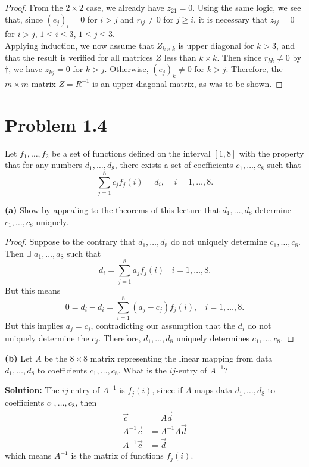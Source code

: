 \documentclass{article}
\newcommand{\enterProblemHeader}[1]{
    \nobreak\extramarks{}{Problem \arabic{#1} continued on next page\ldots}\nobreak{}
    \nobreak\extramarks{Problem \arabic{#1} (continued)}{Problem \arabic{#1} continued on next page\ldots}\nobreak{}
}
\newcommand{\exitProblemHeader}[1]{
    \nobreak\extramarks{Problem \arabic{#1} (continued)}{Problem \arabic{#1} continued on next page\ldots}\nobreak{}
    \stepcounter{#1}
    \nobreak\extramarks{Problem \arabic{#1}}{}\nobreak{}
}
\newcounter{partCounter}
\newcounter{homeworkProblemCounter}
\newenvironment{homeworkProblem}[1][-1]{
    \ifnum#1>0
        \setcounter{homeworkProblemCounter}{#1}
    \fi
    \section{Problem \arabic{homeworkProblemCounter}}
    \setcounter{partCounter}{1}
    \enterProblemHeader{homeworkProblemCounter}
}{
    \exitProblemHeader{homeworkProblemCounter}
}
\begin{document}
\begin{proof}
From the $2 \times 2$ case, we already have $z_{21} = 0$. Using the same logic, we see that, since $(e_j)_i = 0$ for $i > j$ and $r_{ij} \neq 0$ for $j \geq i$, it is necessary that $z_{ij} = 0$ for $i > j$, $1 \leq i \leq 3$, $1 \leq j \leq 3$.\\

Applying induction, we now assume that $Z_{k \times k}$ is upper diagonal for $k > 3$, and that the result is verified for all matrices $Z$ less than $k \times k$. Then since $r_{kk} \neq 0$ by $\dagger$, we have $z_{kj} = 0$ for $k > j$. Otherwise, $(e_j)_k \neq 0$ for $k > j$. Therefore, the $m \times m$ matrix $Z = R^{-1}$ is an upper-diagonal matrix, as was to be shown.

\end{proof} 


\pagebreak
\section*{Problem 1.4}
Let $f_1, \dots , f_2$ be a set of functions defined on the interval $[1, 8]$ with the property that for any numbers $d_1, \dots , d_8$, there exists a set of coefficients $c_1, \dots , c_8$ such that 
\[\sum_{j=1}^8 c_j f_j(i) = d_i, ~~~~~ i = 1, \dots , 8. \]

\textbf{(a)} Show by appealing to the theorems of this lecture that $d_1, \dots , d_8$ determine $c_1, \dots , c_8$ uniquely.

\begin{proof}
    Suppose to the contrary that $d_1, \dots , d_8$ do not uniquely determine $c_1, \dots , c_8$. Then $\exists$ $a_1, \dots , a_8$ such that \[d_i = \sum_{j=1}^8 a_j f_j(i) ~~~~ i = 1, \dots , 8.\] But this means \[0 = d_i - d_i = \sum_{i = 1}^8 (a_j - c_j)f_j(i), ~~~~ i = 1, \dots, 8.\] But this implies $a_j = c_j$, contradicting our assumption that the $d_i$ do not uniquely determine the $c_j$. Therefore, $d_1, \dots , d_8$ uniquely determines $c_1, \dots, c_8$.
\end{proof}

\textbf{(b)} Let $A$ be the $8 \times 8$ matrix representing the linear mapping from data $d_1, \dots , d_8$ to coefficients $c_1, \dots, c_8$. What is the $ij$-entry of $A^{-1}$?

\textbf{Solution:} The $ij$-entry of $A^{-1}$ is $f_j(i)$, since if $A$ maps data $d_1, \dots , d_8$ to coefficients $c_1, \dots, c_8$, then
\begin{align}
    \vec{c} &= A\vec{d}\\
    A^{-1}\vec{c} &= A^{-1}A\vec{d}\\
    A^{-1}\vec{c} &= \vec{d}
\end{align}
which means $A^{-1}$ is the matrix of functions $f_j(i)$.

\pagebreak

%
%

\end{document}

